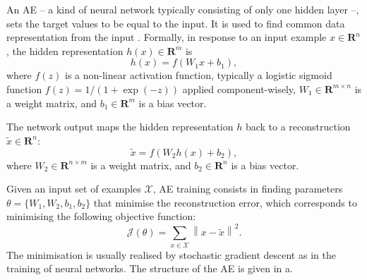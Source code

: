 An AE -- a kind of neural network typically consisting of only one hidden layer --, sets the target values to be equal to the input. It is used to find common data representation from the input \cite{Goodfellow2009-MII,Bengio2007-GLT}. Formally, in response to an input example $x\in \mathbf{R}^{n}$, the hidden representation
$h(x) \in \mathbf{R}^{m}$ is 
\begin{equation} %
h(x) = f(W_{1}x +b_{1}), 
\end{equation}
where $f(z)$ is a non-linear activation function, typically a logistic
sigmoid function $f(z) = 1/(1+\exp(-z)) $ applied component-wisely,
$W_{1} \in \mathbf{R}^{m \times n}$ is a weight matrix, and $b_{1} \in
\mathbf{R}^{m}$ is a bias vector.

The network output maps the hidden representation $h$ back to a
reconstruction $\tilde{x} \in \mathbf{R}^{n}$:
\begin{equation} %
\tilde{x} = f(W_{2}h(x) +b_{2}), 
\end{equation}
where $W_{2} \in \mathbf{R}^{n \times m}$ is a weight matrix, and $b_{2} \in
\mathbf{R}^{n}$ is a bias vector.

Given an input set of examples $\mathcal{X}$, AE training consists
in finding parameters $\theta=\{W_{1},W_{2},b_{1},b_{2}\}$ that
minimise the reconstruction error, which corresponds to minimising
the following objective function:
\begin{equation} %
\mathcal{J}(\theta)=\sum_{x\in{\mathcal{X}}}\left\| x -
\tilde{x}\right\|^{2}.
\end{equation}
The minimisation is usually realised by stochastic gradient descent as
in the training of neural networks. The structure of the AE is given in a.   




